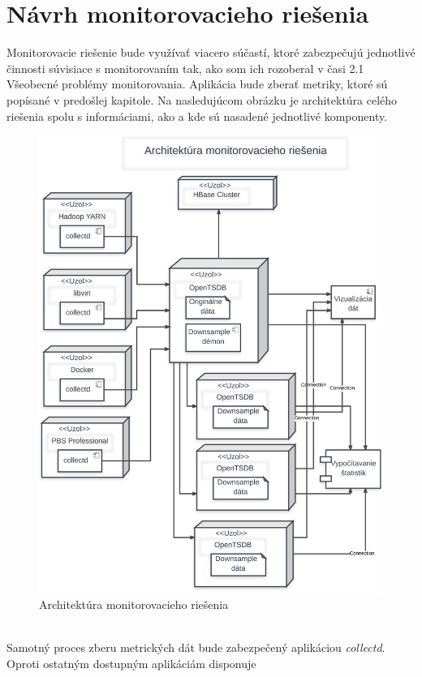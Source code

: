\documentclass[printed,11pt,twoside,color,cover,table]{fithesis3}
\begin{document}
\section{Návrh monitorovacieho riešenia}
Monitorovacie riešenie bude využívať viacero súčastí, ktoré zabezpečujú jednotlivé činnosti súvisiace s monitorovaním tak, ako som ich rozoberal v časi 2.1 Všeobecné problémy monitorovania.
Aplikácia bude zberať metriky, ktoré sú popísané v predošlej kapitole. Na nasledujúcom obrázku je architektúra celého riešenia spolu s informáciami, ako a kde sú nasadené jednotlivé komponenty.
\begin{figure}
\begin{center}
       \includegraphics[width=1.0\textwidth]{images/architektura.png}
       \caption{Architektúra monitorovacieho riešenia}
\end{center}
\end{figure}
\\Samotný proces zberu metrických dát bude zabezpečený aplikáciou \emph{collectd}. Oproti ostatným dostupným aplikáciám disponuje
\end{document}
